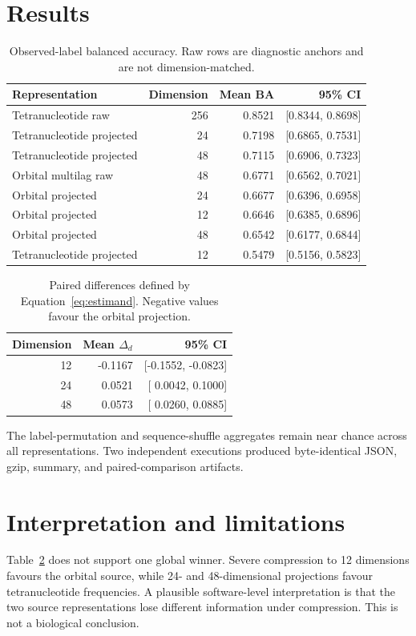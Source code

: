 \documentclass[11pt]{article}
\begin{document}
\section{Results}
\begin{table}[tbp]
\centering
\caption{Observed-label balanced accuracy. Raw rows are diagnostic anchors and are not dimension-matched.}
\label{tab:accuracy}
\begin{tabular}{lrrr}
\toprule
Representation & Dimension & Mean BA & 95\% CI \\
\midrule
Tetranucleotide raw & 256 & 0.8521 & [0.8344, 0.8698] \\
Tetranucleotide projected & 24 & 0.7198 & [0.6865, 0.7531] \\
Tetranucleotide projected & 48 & 0.7115 & [0.6906, 0.7323] \\
Orbital multilag raw & 48 & 0.6771 & [0.6562, 0.7021] \\
Orbital projected & 24 & 0.6677 & [0.6396, 0.6958] \\
Orbital projected & 12 & 0.6646 & [0.6385, 0.6896] \\
Orbital projected & 48 & 0.6542 & [0.6177, 0.6844] \\
Tetranucleotide projected & 12 & 0.5479 & [0.5156, 0.5823] \\
\bottomrule
\end{tabular}
\end{table}

\begin{table}[tbp]
\centering
\caption{Paired differences defined by Equation~\eqref{eq:estimand}. Negative values favour the orbital projection.}
\label{tab:paired}
\begin{tabular}{rrr}
\toprule
Dimension & Mean $\Delta_d$ & 95\% CI \\
\midrule
12 & -0.1167 & [-0.1552, -0.0823] \\
24 &  0.0521 & [ 0.0042,  0.1000] \\
48 &  0.0573 & [ 0.0260,  0.0885] \\
\bottomrule
\end{tabular}
\end{table}

The label-permutation and sequence-shuffle aggregates remain near chance across all representations. Two independent executions produced byte-identical JSON, gzip, summary, and paired-comparison artifacts.

\section{Interpretation and limitations}
Table~\ref{tab:paired} does not support one global winner. Severe compression to 12 dimensions favours the orbital source, while 24- and 48-dimensional projections favour tetranucleotide frequencies. A plausible software-level interpretation is that the two source representations lose different information under compression. This is not a biological conclusion.
\end{document}
